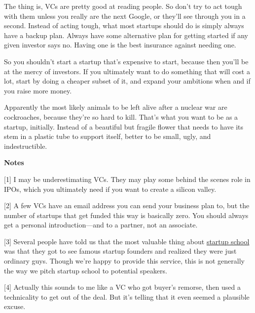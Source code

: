 The
                  thing is, VCs are pretty good at reading people. So don't try
                  to act tough with them unless you really are the next Google,
                  or they'll see through you in a second. Instead of acting
                  tough, what most startups should do is simply always have a
                  backup plan. Always have some alternative plan for getting
                  started if any given investor says no. Having one is the best
                  insurance against needing one.

So you shouldn't
                  start a startup that's expensive to start, because then you'll
                  be at the mercy of investors. If you ultimately want to do
                  something that will cost a lot, start by doing a cheaper
                  subset of it, and expand your ambitions when and if you raise
                  more money.

Apparently the most likely animals to
                  be left alive after a nuclear war are cockroaches, because
                  they're so hard to kill. That's what you want to be as a
                  startup, initially. Instead of a beautiful but fragile flower
                  that needs to have its stem in a plastic tube to support
                  itself, better to be small, ugly, and indestructible.





\textbf{Notes}

[1] I may be underestimating VCs. They may play some behind the
                  scenes role in IPOs, which you ultimately need if you want to
                  create a silicon valley.

[2] A few VCs have an email address you can send your business
                  plan to, but the number of startups that get funded this way
                  is basically zero. You should always get a personal
                  introduction---and to a partner, not an associate.

[3] Several people have told us that the most valuable thing
                  about
                  \href{http://startupschool.org}{startup school}
                  was that they got to see famous startup founders and realized
                  they were just ordinary guys. Though we're happy to provide
                  this service, this is not generally the way we pitch startup
                  school to potential speakers.

[4] Actually this sounds to me like a VC who got buyer's
                  remorse, then used a technicality to get out of the deal. But
                  it's telling that it even seemed a plausible excuse.

